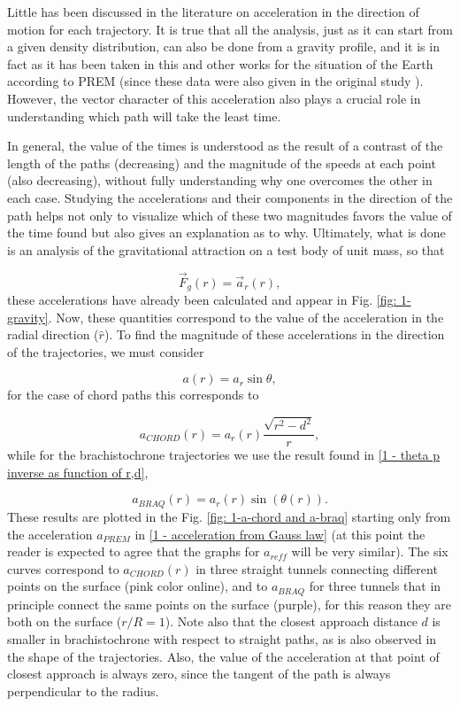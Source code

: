 \documentclass[aps,twocolumn,showpacs,preprintnumbers]{revtex4}
\begin{document}
    Little has been discussed in the literature on acceleration in the direction of motion for each trajectory. It is true that all the analysis, just as it can start from a given density distribution, can also be done from a gravity profile, and it is in fact as it has been taken in this and other works for the situation of the Earth according to PREM (since these data were also given in the original study \cite{PREM}). However, the vector character of this acceleration also plays a crucial role in understanding which path will take the least time.
    
    In general, the value of the times is understood as the result of a contrast of the length of the paths (decreasing) and the magnitude of the speeds at each point (also decreasing), without fully understanding why one overcomes the other in each case. Studying the accelerations and their components in the direction of the path helps not only to visualize which of these two magnitudes favors the value of the time found but also gives an explanation as to why.  Ultimately, what is done is an analysis of the gravitational attraction on a test body of unit mass, so that
   
    \[ \Vec{F}_g (r) = \Vec{a}_r (r) ,\]
    these accelerations have already been calculated and appear in Fig. \ref{fig: 1- gravity}. Now, these quantities correspond to the value of the acceleration in the radial direction ($ \hat{r} $). To find the magnitude of these accelerations in the direction of the trajectories, we must consider
    
    \[ a(r) = a_r \sin{\theta} ,\]
    for the case of chord paths this corresponds to
    
    \[ a_{CHORD}(r) = a_r(r) \frac{\sqrt{r^2 - d^2}}{r}, \]
    while for the brachistochrone trajectories we use the result found in \eqref{1 - theta p inverse as function of r,d},
    
    \[ a_{BRAQ}(r) = a_r(r) \sin{\left(\theta(r)\right)}. \]
    These results are plotted in the Fig. \ref{fig: 1-a-chord and a-braq} starting only from the acceleration $ a_{PREM} $ in \eqref{1 - acceleration from Gauss law} (at this point the reader is expected to agree that the graphs for $ a_{r eff} $ will be very similar). The six curves correspond to $ a_{CHORD} (r) $ in three straight tunnels connecting different points on the surface (pink color online), and to $ a_{BRAQ} $ for three tunnels that in principle connect the same points on the surface (purple), for this reason they are both on the surface ($ r / R = 1 $). Note also that the closest approach distance $ d $ is smaller in brachistochrone with respect to straight paths, as is also observed in the shape of the trajectories. Also, the value of the acceleration at that point of closest approach is always zero, since the tangent of the path is always perpendicular to the radius.    
        
\end{document}
